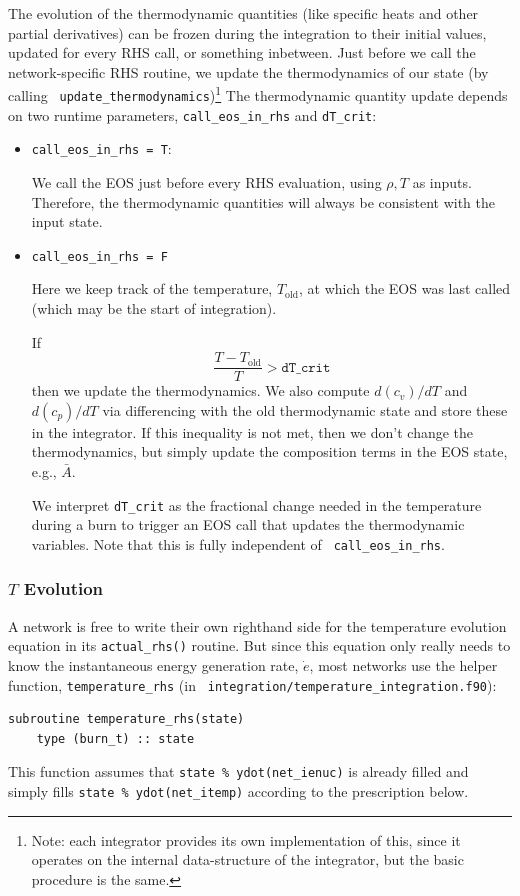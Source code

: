 The evolution of the thermodynamic quantities (like specific heats and
other partial derivatives) can be frozen during the integration to
their initial values, updated for every RHS call, or something
inbetween.  Just before we call the network-specific RHS routine, we
update the thermodynamics of our state (by calling {\tt
  update\_thermodynamics})\footnote{Note: each integrator provides its
  own implementation of this, since it operates on the internal
  data-structure of the integrator, but the basic procedure is the
  same.}  The thermodynamic quantity update depends on two runtime
parameters, {\tt call\_eos\_in\_rhs} and {\tt dT\_crit}:
\begin{itemize}
\item {\tt call\_eos\_in\_rhs = T}:

  We call the EOS just before every RHS evaluation, using $\rho, T$ as
  inputs.  Therefore, the thermodynamic quantities will always be
  consistent with the input state.

\item {\tt call\_eos\_in\_rhs = F}

  Here we keep track of the temperature, $T_\mathrm{old}$, at
  which the EOS was last called (which may be the start of integration).

  If
  \begin{equation}
    \frac{T - T_\mathrm{old}}{T} > \mathtt{dT\_crit}
    \end{equation}
  then we update the thermodynamics.  We also compute $d(c_v)/dT$ and
  $d(c_p)/dT$ via differencing with the old thermodynamic state and
  store these in the integrator.  If this inequality is not met, then
  we don't change the thermodynamics, but simply update the
  composition terms in the EOS state, e.g., $\bar{A}$.

We interpret {\tt dT\_crit} as the fractional change needed in the
temperature during a burn to trigger an EOS call that updates the
thermodynamic variables.  Note that this is fully independent of {\tt
  call\_eos\_in\_rhs}.

\end{itemize}



\subsubsection{$T$ Evolution}

A network is free to write their own righthand side for the
temperature evolution equation in its {\tt actual\_rhs()} routine.
But since this equation only really needs to know the instantaneous
energy generation rate, $\dot{e}$, most networks use the helper
function, {\tt temperature\_rhs} (in {\tt
  integration/temperature\_integration.f90}):
\begin{lstlisting}[language={[95]fortran}]
  subroutine temperature_rhs(state)
    type (burn_t) :: state
\end{lstlisting}
This function assumes that {\tt state \% ydot(net\_ienuc)} is already
filled and simply fills {\tt state \% ydot(net\_itemp)} according to
the prescription below.


